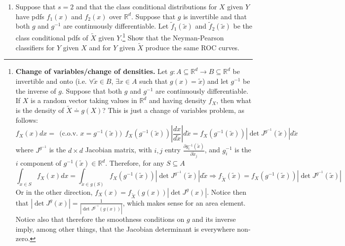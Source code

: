 \documentclass[11pt]{report}
\begin{document}
\begin{enumerate}[1.]
\begin{enumerate}
		      \item Suppose that $s=2$ and that the class conditional distributions for $X$ given $Y$ have pdfs $f_1(x)$ and $f_2(x)$ over $\mathbb{R}^d$. Suppose that $g$ is invertible and that both $g$ and $g^{-1}$ are continuously differentiable. Let $\tilde f_1(\tilde x)$ and $\tilde f_2(\tilde x)$ be the class conditional pdfs of $\tilde X$ given $Y$.\footnote
		            {
		            {\bf Change of variables/change of densities.} Let
		            $g:A\subseteq \mathds{R}^d \to B \subseteq\mathds{R}^d$ be invertible and onto (i.e. $\forall \tilde{x}\in B$, $\exists x\in A$ such that $g(x) = \tilde{x}$) and let $g^{-1}$ be the inverse of $g$. Suppose that both $g$ and $g^{-1}$ are continuously differentiable. If $X$ is a random vector taking values in $\mathds{R}^d$ and having density $f_X$, then what is the density of $\tilde{X}\doteq
			            g(X)$? This is just a change of variables problem, as follows:
		            \[
			            f_X(x)dx =\ \ \text{(c.o.v. $x=g^{-1}(\tilde{x})$)}\ \
			            f_X\left(g^{-1}(\tilde{x})\right)
			            \left|\frac{dx}{d\tilde{x}}\right|d\tilde{x}
			            = f_X\left(g^{-1}(\tilde{x})\right)
			            \left|\det J^{g^{-1}}(\tilde{x})\right|d\tilde{x}
		            \]
		            where $J^{g^{-1}}$ is the $d\times d$ Jacobian matrix, with $i,j$ entry
		            $\frac{\partial g_i^{-1}(\tilde{x})}{\partial \tilde{x}_j}$, and $g_i^{-1}$ is the $i$ component of $g^{-1}(\tilde{x})\in\mathds{R}^d$.
		            Therefore, for any $S\subseteq A$
		            \[
			            \int_{x\in S} f_X(x)dx
			            = \int_{\tilde{x}\in g(S)} f_X\left(g^{-1}(\tilde{x})\right)
			            \left|\det J^{g^{-1}}(\tilde{x})\right|d\tilde{x}
			            \Longrightarrow f_{\tilde{X}}(\tilde{x}) =
			            f_X\left(g^{-1}(\tilde{x})\right)
			            \left|\det J^{g^{-1}}(\tilde{x})\right|
		            \]
		            Or in the other direction,
		            $\displaystyle
			            f_X(x) =
			            f_{\tilde{X}}\left(g({x})\right)
			            \left|\det J^{g}(x)\right|
		            $. Notice then that $\displaystyle \left|\det J^{g}(x)\right|
			            =\frac{1}{\left|\det J^{g^{-1}}\left(g(x)\right)\right|}$, which makes sense for an area element.
		            Notice also that therefore the smoothness conditions on $g$ and its inverse imply, among other things, that the Jacobian determinant is everywhere non-zero.
		            }
		            Show that the Neyman-Pearson classifiers for $Y$ given $X$ and for $Y$ given $\tilde{X}$ produce the same ROC curves.


\end{enumerate}
\end{enumerate}
\end{document}
